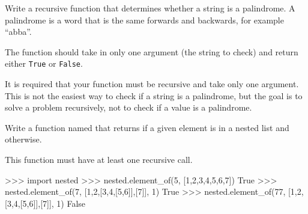 \documentclass[11pt]{cselabheader}
\begin{document}
\begin{ex}[palindrome.py] Write a recursive function that determines
whether a string is a palindrome. A palindrome is a word that is the
same forwards and backwards, for example ``abba''.

The function should take in only one argument (the string to
check) and return either \lstinline{True} or \lstinline{False}.

It is required that your function must be recursive and take only
one argument.  This is not the easiest way to check if a string is a
palindrome, but the goal is to solve a problem recursively, not to
check if a value is a palindrome.
\end{ex}

\begin{ex}[nested.py]
Write a function named  that returns
 if a given element is in a nested list and
 otherwise.

This function must have at least one recursive call.

\begin{pyconcode}
>>> import nested
>>> nested.element_of(5, [1,2,3,4,5,6,7])
True
>>> nested.element_of(7, [1,2,[3,4,[5,6]],[7]], 1)
True
>>> nested.element_of(77, [1,2,[3,4,[5,6]],[7]], 1)
False
\end{pyconcode}
\end{ex}
\end{document}
